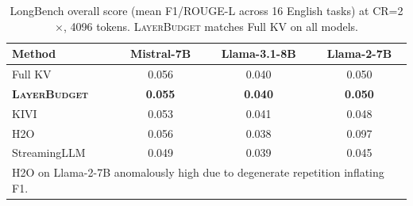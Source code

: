 \documentclass{article}
\newcommand{\layerbudget}{\textsc{LayerBudget}\xspace}
\begin{document}
\begin{table}[h]
\centering
\caption{LongBench overall score (mean F1/ROUGE-L across 16 English tasks) at CR=2$\times$, 4096 tokens.  \layerbudget matches Full KV on all models.}
\label{tab:longbench}
\small
\begin{tabular}{@{}lccc@{}}
\toprule
Method & Mistral-7B & Llama-3.1-8B & Llama-2-7B \\
\midrule
Full KV              & 0.056 & 0.040 & 0.050 \\
\textbf{\layerbudget} & \textbf{0.055} & \textbf{0.040} & \textbf{0.050} \\
KIVI                 & 0.053 & 0.041 & 0.048 \\
H2O                  & 0.056 & 0.038 & 0.097 \\
StreamingLLM         & 0.049 & 0.039 & 0.045 \\
\bottomrule
\multicolumn{4}{l}{\scriptsize H2O on Llama-2-7B anomalously high due to degenerate repetition inflating F1.}
\end{tabular}
\end{table}
\end{document}
